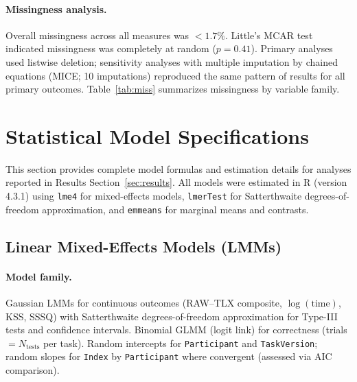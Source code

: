 \documentclass[sigconf]{acmart}
\begin{document}
\paragraph{Missingness analysis.}
Overall missingness across all measures was \(<1.7\%\). Little's MCAR test indicated missingness was completely at random (\(p{=}0.41\)). Primary analyses used listwise deletion; sensitivity analyses with multiple imputation by chained equations (MICE; 10 imputations) reproduced the same pattern of results for all primary outcomes. Table~\ref{tab:miss} summarizes missingness by variable family.

\begin{table}[h!]
  \centering
  \caption{Missingness by variable family. All missingness rates were below 2\% and treated as MCAR.}
  \label{tab:miss}
  \small
\end{table}

\section{Statistical Model Specifications}
\label{app:stats-spec}

This section provides complete model formulas and estimation details for analyses reported in Results Section~\ref{sec:results}. All models were estimated in R (version 4.3.1) using \texttt{lme4} for mixed-effects models, \texttt{lmerTest} for Satterthwaite degrees-of-freedom approximation, and \texttt{emmeans} for marginal means and contrasts.

\subsection{Linear Mixed-Effects Models (LMMs)}

\paragraph{Model family.}
Gaussian LMMs for continuous outcomes (RAW--TLX composite, \(\log(\text{time})\), KSS, SSSQ) with Satterthwaite degrees-of-freedom approximation for Type-III tests and confidence intervals. Binomial GLMM (logit link) for correctness (trials \(=N_{\text{tests}}\) per task). Random intercepts for \texttt{Participant} and \texttt{TaskVersion}; random slopes for \texttt{Index} by \texttt{Participant} where convergent (assessed via AIC comparison).
\end{document}
